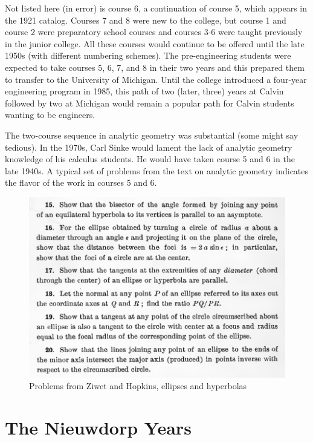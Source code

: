 \documentclass[
]{book}
\begin{document}
Not listed here (in error) is course 6, a continuation of course 5, which appears in the 1921 catalog. Courses 7 and 8 were new to the college, but course 1 and course 2 were preparatory school courses and courses 3-6 were taught previously in the junior college.
All these courses would continue to be offered until the late 1950s (with different numbering schemes).
The pre-engineering students were expected to take courses 5, 6, 7, and 8 in their two years and this prepared them to transfer to the University of Michigan. Until the college introduced a four-year engineering program in 1985, this path of two (later, three) years at Calvin followed by two at Michigan would remain a popular path for Calvin students wanting to be engineers.

The two-course sequence in analytic geometry was substantial (some might say tedious). In the 1970s, Carl Sinke would lament the lack of analytic geometry knowledge of his calculus students. He would have taken course 5 and 6 in the late 1940s.
A typical set of problems from the text on analytic geometry indicates the flavor of the work in courses 5 and 6.

\begin{figure}

{\centering \includegraphics[width=12.06in]{images/ellipseandhyperbola} 

}

\caption{Problems from Ziwet and Hopkins, ellipses and hyperbolas }\label{fig:analytgeom}
\end{figure}

\hypertarget{the-nieuwdorp-years}{%
\section{The Nieuwdorp Years}\label{the-nieuwdorp-years}}
\end{document}

